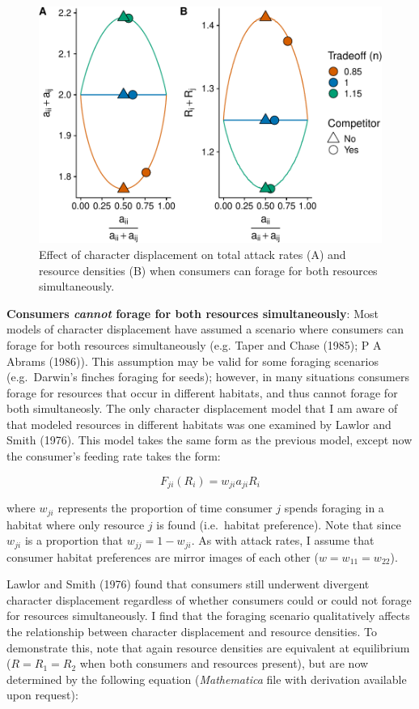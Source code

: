 \documentclass[11pt,]{article}
\begin{document}
\begin{figure}
\centering
\includegraphics{ECD_Supp_Mat_files/figure-latex/MacArthur_Resources-1.pdf}
\caption{\label{fig:MacArthur_Resources}Effect of character displacement
on total attack rates (A) and resource densities (B) when consumers can
forage for both resources simultaneously.}
\end{figure}

\textbf{Consumers \emph{cannot} forage for both resources
simultaneously}: Most models of character displacement have assumed a
scenario where consumers can forage for both resources simultaneously
(e.g. Taper and Chase (1985); P A Abrams (1986)). This assumption may be
valid for some foraging scenarios (e.g.~Darwin's finches foraging for
seeds); however, in many situations consumers forage for resources that
occur in different habitats, and thus cannot forage for both
simultaneosly. The only character displacement model that I am aware of
that modeled resources in different habitats was one examined by Lawlor
and Smith (1976). This model takes the same form as the previous model,
except now the consumer's feeding rate takes the form:

\[F_{ji}(R_i)=w_{ji}a_{ji}R_i\]

where \(w_{ji}\) represents the proportion of time consumer \(j\) spends
foraging in a habitat where only resource \(j\) is found (i.e.~habitat
preference). Note that since \(w_{ji}\) is a proportion that
\(w_{jj}=1-w_{ji}\). As with attack rates, I assume that consumer
habitat preferences are mirror images of each other
(\(w=w_{11}=w_{22}\)).

Lawlor and Smith (1976) found that consumers still underwent divergent
character displacement regardless of whether consumers could or could
not forage for resources simultaneously. I find that the foraging
scenario qualitatively affects the relationship between character
displacement and resource densities. To demonstrate this, note that
again resource densities are equivalent at equilibrium (\(R=R_1=R_2\)
when both consumers and resources present), but are now determined by
the following equation (\emph{Mathematica} file with derivation
available upon request):
\end{document}
